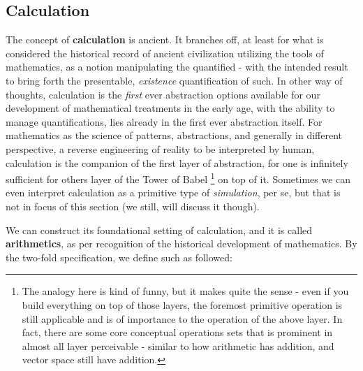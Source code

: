 \subsection{Calculation}
The concept of \textbf{calculation} is ancient. It branches off, at least for what is considered the historical record of ancient civilization utilizing the tools of mathematics, as a notion manipulating the quantified - with the intended result to bring forth the presentable, \textit{existence} quantification of such. In other way of thoughts, calculation is the \textit{first} ever abstraction options available for our development of mathematical treatments in the early age, with the ability to manage quantifications, lies already in the first ever abstraction itself. For mathematics as the science of patterns, abstractions, and generally in different perspective, a reverse engineering of reality to be interpreted by human, calculation is the companion of the first layer of abstraction, for one is infinitely sufficient for others layer of the Tower of Babel \footnote{The analogy here is kind of funny, but it makes quite the sense - even if you build everything on top of those layers, the foremost primitive operation is still applicable and is of importance to the operation of the above layer. In fact, there are some core conceptual operations sets that is prominent in almost all layer perceivable - similar to how arithmetic has addition, and vector space still have addition.} on top of it. Sometimes we can even interpret calculation as a primitive type of \textit{simulation}, per se, but that is not in focus of this section (we still, will discuss it though). 

We can construct its foundational setting of calculation, and it is called \textbf{arithmetics}, as per recognition of the historical development of mathematics. By the two-fold specification, we define such as followed:


